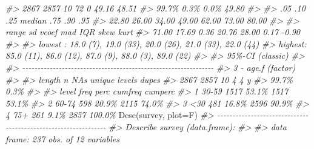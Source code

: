 \documentclass[
]{book}
\newenvironment{Shaded}{\begin{snugshade}}{\end{snugshade}}
\newcommand{\AttributeTok}[1]{\textcolor[rgb]{0.77,0.63,0.00}{#1}}
\newcommand{\CommentTok}[1]{\textcolor[rgb]{0.56,0.35,0.01}{\textit{#1}}}
\newcommand{\FunctionTok}[1]{\textcolor[rgb]{0.00,0.00,0.00}{#1}}
\newcommand{\NormalTok}[1]{#1}
\begin{document}
\begin{Shaded}
\begin{Highlighting}[]
\CommentTok{\#\textgreater{}    2\textquotesingle{}867  2\textquotesingle{}857     10      72      0  49.16   48.51}
\CommentTok{\#\textgreater{}           99.7\%   0.3\%           0.0\%          49.80}
\CommentTok{\#\textgreater{}                                                     }
\CommentTok{\#\textgreater{}      .05    .10    .25  median    .75    .90     .95}
\CommentTok{\#\textgreater{}    22.80  26.00  34.00   49.00  62.00  73.00   80.00}
\CommentTok{\#\textgreater{}                                                     }
\CommentTok{\#\textgreater{}    range     sd  vcoef     mad    IQR   skew    kurt}
\CommentTok{\#\textgreater{}    71.00  17.69   0.36   20.76  28.00   0.17   {-}0.90}
\CommentTok{\#\textgreater{}                                                     }
\CommentTok{\#\textgreater{} lowest : 18.0 (7), 19.0 (33), 20.0 (26), 21.0 (33), 22.0 (44)}
\CommentTok{\#\textgreater{} highest: 85.0 (11), 86.0 (12), 87.0 (9), 88.0 (3), 89.0 (22)}
\CommentTok{\#\textgreater{} }
\CommentTok{\#\textgreater{} \textquotesingle{} 95\%{-}CI (classic)}
\CommentTok{\#\textgreater{} }
\CommentTok{\#\textgreater{} {-}{-}{-}{-}{-}{-}{-}{-}{-}{-}{-}{-}{-}{-}{-}{-}{-}{-}{-}{-}{-}{-}{-}{-}{-}{-}{-}{-}{-}{-}{-}{-}{-}{-}{-}{-}{-}{-}{-}{-}{-}{-}{-}{-}{-}{-}{-}{-}{-}{-}{-}{-}{-}{-}{-}{-}{-}{-}{-}{-}{-}{-}{-} }
\CommentTok{\#\textgreater{} 3 {-} age.f (factor)}
\CommentTok{\#\textgreater{} }
\CommentTok{\#\textgreater{}   length      n    NAs unique levels  dupes}
\CommentTok{\#\textgreater{}    2\textquotesingle{}867  2\textquotesingle{}857     10      4      4      y}
\CommentTok{\#\textgreater{}           99.7\%   0.3\%                     }
\CommentTok{\#\textgreater{} }
\CommentTok{\#\textgreater{}    level   freq   perc  cumfreq  cumperc}
\CommentTok{\#\textgreater{} 1  30{-}59  1\textquotesingle{}517  53.1\%    1\textquotesingle{}517    53.1\%}
\CommentTok{\#\textgreater{} 2  60{-}74    598  20.9\%    2\textquotesingle{}115    74.0\%}
\CommentTok{\#\textgreater{} 3    \textless{}30    481  16.8\%    2\textquotesingle{}596    90.9\%}
\CommentTok{\#\textgreater{} 4    75+    261   9.1\%    2\textquotesingle{}857   100.0\%}
\FunctionTok{Desc}\NormalTok{(survey, }\AttributeTok{plot=}\NormalTok{F)}
\CommentTok{\#\textgreater{} {-}{-}{-}{-}{-}{-}{-}{-}{-}{-}{-}{-}{-}{-}{-}{-}{-}{-}{-}{-}{-}{-}{-}{-}{-}{-}{-}{-}{-}{-}{-}{-}{-}{-}{-}{-}{-}{-}{-}{-}{-}{-}{-}{-}{-}{-}{-}{-}{-}{-}{-}{-}{-}{-}{-}{-}{-}{-}{-}{-}{-}{-}{-} }
\CommentTok{\#\textgreater{} Describe survey (data.frame):}
\CommentTok{\#\textgreater{} }
\CommentTok{\#\textgreater{} data frame:  237 obs. of  12 variables}

\end{Highlighting}
\end{Shaded}
\end{document}
